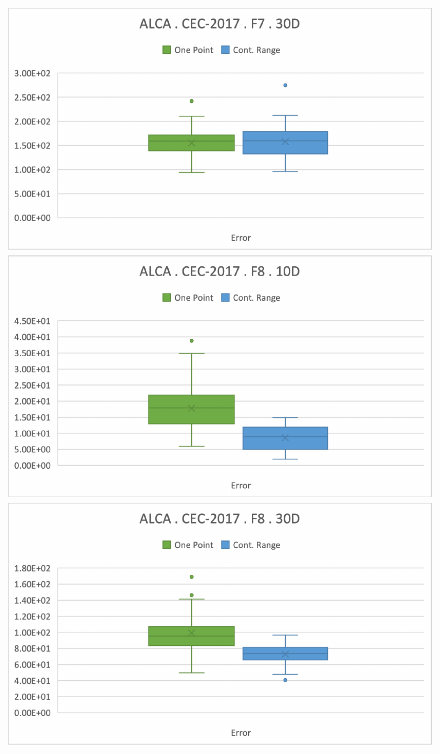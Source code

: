 \documentclass[graybox]{svmult}
\begin{document}
\begin{figure}[!ht]
\begin{minipage}[h]{0.49\linewidth}
        \end{minipage}
        \hfill
        \begin{minipage}[h]{0.49\linewidth}
            \includegraphics[width=1\linewidth]{img/fig_experiment_F7x30D.pdf} 
        \end{minipage}
        \vfill
        \vspace{0.05 cm}
        \begin{minipage}[h]{0.49\linewidth}
            \includegraphics[width=1\linewidth]{img/fig_experiment_F8x10D.pdf} 
        \end{minipage}
        \hfill
        \begin{minipage}[h]{0.49\linewidth}
            \includegraphics[width=1\linewidth]{img/fig_experiment_F8x30D.pdf} 

\end{minipage}
\end{figure}
\end{document}
